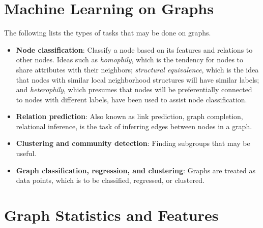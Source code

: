 \documentclass[twocolumn]{article}
\theoremstyle{plain}
\begin{document}
\section{Machine Learning on Graphs}

The following lists the types of tasks that may be done on graphs.

\begin{itemize}
    \item \textbf{Node classification}: Classify a node based on its features and relations to other nodes. Ideas such as \textit{homophily}, which is the tendency for nodes to share attributes with their neighbors; \textit{structural equivalence}, which is the idea that nodes with similar local neighborhood structures will have similar labels; and \textit{heterophily}, which presumes that nodes will be preferentially connected to nodes with different labels, have been used to assist node classification.
    \item \textbf{Relation prediction}: Also known as link prediction, graph completion, relational inference, is the task of inferring edges between nodes in a graph.
    \item \textbf{Clustering and community detection}: Finding subgroups that may be useful.
    \item \textbf{Graph classification, regression, and clustering}: Graphs are treated as data points, which is to be classified, regressed, or clustered.
\end{itemize}

\section{Graph Statistics and Features}
\end{document}
